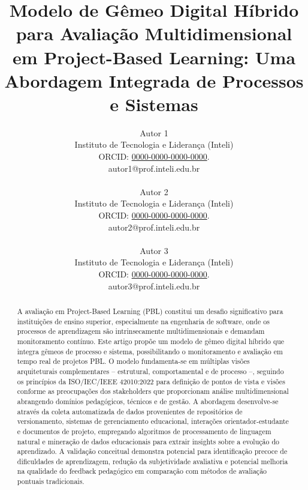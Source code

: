 \documentclass[english, spanish, brazilian]{modelo_dt}
\title{Modelo de Gêmeo Digital Híbrido para Avaliação Multidimensional em Project-Based Learning: Uma Abordagem Integrada de Processos e Sistemas}
\author{%
	Autor 1\\
	Instituto de Tecnologia e Liderança (Inteli)\\
	ORCID: \href{https://orcid.org/0000-0000-0000-0000}{0000-0000-0000-0000}\@.\\
	autor1@prof.inteli.edu.br\\
	\\
	Autor 2\\
	Instituto de Tecnologia e Liderança (Inteli)\\
	ORCID: \href{https://orcid.org/0000-0000-0000-0000}{0000-0000-0000-0000}\@.\\
	autor2@prof.inteli.edu.br\\
	\\
	Autor 3\\
	Instituto de Tecnologia e Liderança (Inteli)\\
	ORCID: \href{https://orcid.org/0000-0000-0000-0000}{0000-0000-0000-0000}\@.\\
	autor3@prof.inteli.edu.br
}
\begin{document}
\maketitle

\begin{otherlanguage}{brazilian}
  \renewcommand{\abstractname}{Resumo}
  \begin{abstract}
    A avaliação em Project-Based Learning (PBL) constitui um desafio significativo para instituições de ensino superior, especialmente na engenharia de software, onde os processos de aprendizagem são intrinsecamente multidimensionais e demandam monitoramento contínuo. Este artigo propõe um modelo de gêmeo digital híbrido que integra gêmeos de processo e sistema, possibilitando o monitoramento e avaliação em tempo real de projetos PBL. O modelo fundamenta-se em múltiplas visões arquiteturais complementares -- estrutural, comportamental e de processo --, seguindo os princípios da ISO/IEC/IEEE 42010:2022 para definição de pontos de vista e visões conforme as preocupações dos stakeholders que proporcionam análise multidimensional abrangendo domínios pedagógicos, técnicos e de gestão. A abordagem desenvolve-se através da coleta automatizada de dados provenientes de repositórios de versionamento, sistemas de gerenciamento educacional, interações orientador-estudante e documentos de projeto, empregando algoritmos de processamento de linguagem natural e mineração de dados educacionais para extrair insights sobre a evolução do aprendizado. A validação conceitual demonstra potencial para identificação precoce de dificuldades de aprendizagem, redução da subjetividade avaliativa e potencial melhoria na qualidade do feedback pedagógico em comparação com métodos de avaliação pontuais tradicionais.
  \end{abstract}
\end{otherlanguage}
\end{document}
